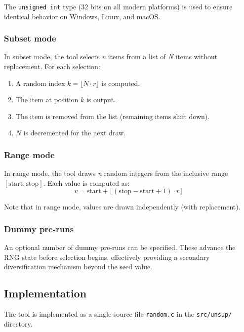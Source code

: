 The {\tt unsigned int} type (32 bits on all modern platforms) is used
to ensure identical behavior on Windows, Linux, and macOS.

\subsubsection{Subset mode}

In subset mode, the tool selects {\em n} items from a list of {\em N}
items without replacement. For each selection:
\begin{enumerate}
\item A random index $k = \lfloor N \cdot r \rfloor$ is computed.
\item The item at position $k$ is output.
\item The item is removed from the list (remaining items shift down).
\item $N$ is decremented for the next draw.
\end{enumerate}

\subsubsection{Range mode}

In range mode, the tool draws {\em n} random integers from the
inclusive range $[\mathrm{start}, \mathrm{stop}]$. Each value is computed
as:
\[
  v = \mathrm{start} + \lfloor (\mathrm{stop} - \mathrm{start} + 1) \cdot r \rfloor
\]

Note that in range mode, values are drawn independently (with
replacement).

\subsubsection{Dummy pre-runs}

An optional number of dummy pre-runs can be specified. These advance
the RNG state before selection begins, effectively providing a
secondary diversification mechanism beyond the seed value.

\subsection{Implementation}

The tool is implemented as a single source file {\tt random.c} in the
{\tt src/unsup/} directory.

